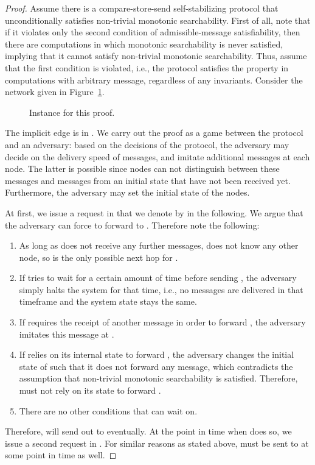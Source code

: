 \documentclass[a4paper,USenglish]{lipics}
\begin{document}
\begin{proof}
  Assume there is a compare-store-send self-stabilizing protocol that unconditionally satisfies non-trivial monotonic searchability.
  First of all, note that if it violates only the second condition of admissible-message satisfiability, then there are computations in which monotonic searchability is never satisfied, implying that it cannot satisfy non-trivial monotonic searchability.
  Thus, assume that the first condition is violated, i.e., the protocol satisfies the property in computations with arbitrary message, regardless of any invariants.
  Consider the network given in Figure~\ref{fig:no_corrupt}.
  \begin{figure}[h]
    \centering
	\caption{Instance for this proof.}\label{fig:no_corrupt}
 \end{figure}
 
 The implicit edge  is in .
 We carry out the proof as a game between the protocol and an adversary: based on the decisions of the protocol,  the adversary may decide on the delivery speed of messages, and imitate additional messages at each node.
 The latter is possible since nodes can not distinguish between these messages and messages from an initial state that have not been received yet.
 Furthermore, the adversary may set the initial state of the nodes.
 
 At first, we issue a  request in  that we denote by  in the following.
 We argue that the adversary can force  to forward  to .
 Therefore note the following:
 \begin{enumerate}
  \item As long as  does not receive any further messages,  does not know any other node, so  is the only possible next hop for .
  \item If  tries to wait for a certain amount of time before sending , the adversary simply halts the system for that time, i.e., no messages are delivered in that timeframe and the system state stays the same.
  \item If  requires the receipt of another message in order to forward , the adversary imitates this message at .
  \item If  relies on its internal state to forward , the adversary changes the initial state of  such that it does not forward any message, which contradicts the assumption that non-trivial monotonic searchability is satisfied.
  Therefore,  must not rely on its state to forward .
  \item There are no other conditions that  can wait on.
 \end{enumerate}
 Therefore,  will send out  to  eventually. At the point in time when  does so, we issue a second  request in .
 For similar reasons as stated above,  must be sent to  at some point in time as well.
 

\end{proof}
\end{document}

